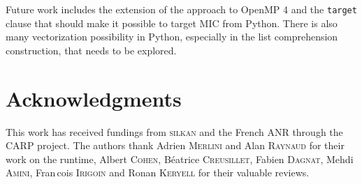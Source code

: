 \documentclass{llncs}
\begin{document}
Future work includes the extension of the approach to OpenMP 4 and the
\texttt{target} clause that should make it possible to target MIC from Python.
There is also many vectorization possibility in Python, especially in the list
comprehension construction, that needs to be explored.

\section*{Acknowledgments}

This work has received fundings from \textsc{silkan} and the French ANR through the
CARP project. The authors thank Adrien \textsc{Merlini} and Alan
\textsc{Raynaud} for their work on the runtime, Albert \textsc{Cohen},
B{\'e}atrice \textsc{Creusillet}, Fabien \textsc{Dagnat}, Mehdi \textsc{Amini},
Fran{\,c}ois \textsc{Irigoin} and Ronan \textsc{Keryell} for their valuable
reviews.



\end{document}
